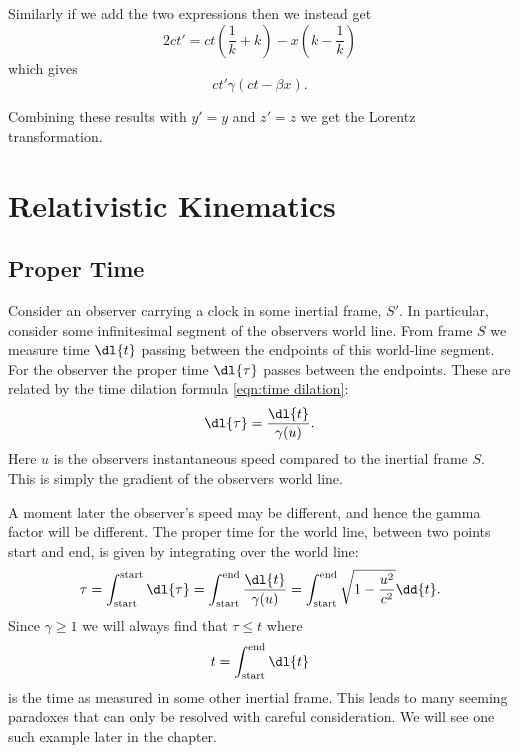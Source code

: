 \documentclass[fleqn]{NotesClass}
\begin{document}
    Similarly if we add the two expressions then we instead get
    \begin{equation}
        2ct' = ct\left( \frac{1}{k} + k \right) - x(k - \frac{1}{k})
    \end{equation}
    which gives
    \begin{equation}
        ct' \gamma(ct - \beta x).
    \end{equation}
    
    Combining these results with \(y' = y\) and \(z' = z\) we get the Lorentz transformation.
    
    \chapter{Relativistic Kinematics}
    \section{Proper Time}
    Consider an observer carrying a clock in some inertial frame, \(S'\).
    In particular, consider some infinitesimal segment of the observers world line.
    From frame \(S\) we measure time \(\dl{t}\) passing between the endpoints of this world-line segment.
    For the observer the proper time \(\dl{\tau}\) passes between the endpoints.
    These are related by the time dilation formula \cref{eqn:time dilation}:
    \begin{equation}
        \dl{\tau} = \frac{\dl{t}}{\gamma(u)}.
    \end{equation}
    Here \(u\) is the observers instantaneous speed compared to the inertial frame \(S\).
    This is simply the gradient of the observers world line.
    
    A moment later the observer's speed may be different, and hence the gamma factor will be different.
    The proper time for the world line, between two points start and end, is given by integrating over the world line:
    \begin{equation}
        \tau = \int_{\text{start}}^{\text{start}} \dl{\tau} = \int_{\text{start}}^{\text{end}} \frac{\dl{t}}{\gamma(u)} = \int_{\text{start}}^{\text{end}} \sqrt{1 - \frac{u^2}{c^2}} \dd{t}.
    \end{equation}
    Since \(\gamma \ge 1\) we will always find that \(\tau \le t\) where
    \begin{equation}
        t = \int_{\text{start}}^{\text{end}} \dl{t}
    \end{equation}
    is the time as measured in some other inertial frame.
    This leads to many seeming paradoxes that can only be resolved with careful consideration.
    We will see one such example later in the chapter.
    
\end{document}
